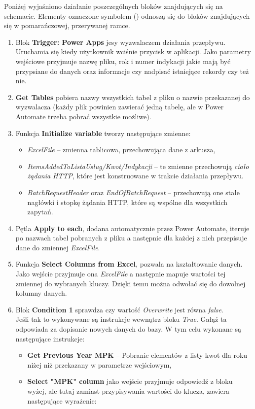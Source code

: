 Poniżej wyjaśniono działanie poszczególnych bloków znajdujących się na schemacie. Elementy oznaczone symbolem (\textasteriskcentered) odnoszą się do bloków znajdujących się w pomarańczowej, przerywanej ramce.
\begin{enumerate}
    \item Blok \textbf{Trigger: Power Apps} jesy wyzwalaczem działania przepływu. Uruchamia się kiedy użytkownik wciśnie przycisk w aplikacji. Jako parametry wejściowe przyjmuje nazwę pliku, rok i numer indykacji jakie mają być przypsiane do danych oraz informacje czy nadpisać istniejące rekordy czy też nie.
    
    \item \textbf{Get Tables} pobiera nazwy wszystkich tabel z pliku o nazwie przekazanej do wyzwalacza (każdy plik powinien zawierać jedną tabelę, ale w Power Automate trzeba pobrać wszystkie możliwe).
    \item Funkcja \textbf{Initialize variable} tworzy następujące zmienne:
    \begin{itemize}
    \item \emph{ExcelFile} -- zmienna tablicowa, przechowująca dane z arkusza,
    \item \emph{ItemsAddedToListaUsług/Kwot/Indykacji} -- te zmienne przechowują \emph{ciało żądania HTTP}, które jest konstruowane w trakcie działania przepływu.
    \item \emph{BatchRequestHeader} oraz \emph{EndOfBatchRequest} -- przechowują one stałe nagłówki i stopkę żądania HTTP, które są wspólne dla wszystkich zapytań.
    \end{itemize}
    \item Pętla \textbf{Apply to each}, dodana automatycznie przez Power Automate, iteruje po nazwach tabel pobranych z pliku a następnie dla każdej z nich przepisuje dane do zmiennej \emph{ExcelFile}. 
    \item Funkcja \textbf{Select Columns from Excel}, pozwala na kształtowanie danych. Jako wejście przyjmuje ona \emph{ExcelFile} a następnie mapuje wartości tej zmiennej do wybranych kluczy. Dzięki temu można odwołać się do dowolnej kolumny danych.
    \item Blok \textbf{Condition 1} sprawdza czy wartość \emph{Overwrite} jest równa \emph{false}. \\
    Jeśli tak to wykonywane są instrukcje wewnątrz bloku \emph{True}. Gałąź ta odpowiada za dopisanie nowych danych do bazy. W tym celu wykonane są następujące instrukcje:
    \begin{itemize}[label=\textasteriskcentered]
        \item \textbf{Get Previous Year MPK} -- Pobranie elementów z listy kwot dla roku niżej niż przekazany w parametrze wejściowym,
        \item \textbf{Select "MPK" column} jako wejście przyjmuje odpowiedź z bloku wyżej, ale tutaj zamiast przypisywania wartości do klucza, zawiera następujące wyrażenie:
        

\end{itemize}
\end{enumerate}
